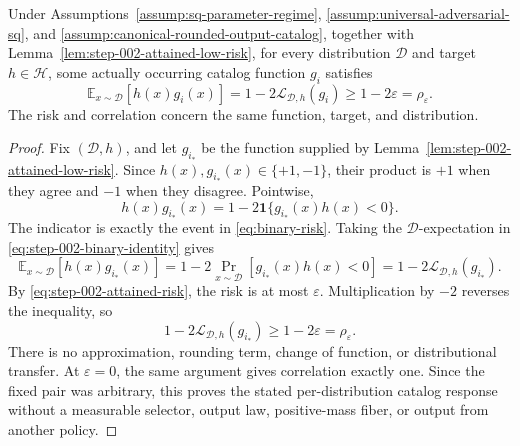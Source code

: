 \begin{proposition}
\label{prop:step-002-exact-correlation}
Under Assumptions~\ref{assump:sq-parameter-regime},
\ref{assump:universal-adversarial-sq}, and
\ref{assump:canonical-rounded-output-catalog}, together with
Lemma~\ref{lem:step-002-attained-low-risk}, for every distribution
\(\mathcal D\) and target \(h\in\mathcal H\), some actually occurring
catalog function \(g_i\) satisfies
\begin{equation}
\mathbb E_{x\sim\mathcal D}[h(x)g_i(x)]
=1-2\mathcal L_{\mathcal D,h}(g_i)
\ge1-2\varepsilon
=\rho_{\varepsilon}.
\label{eq:step-002-correlation}
\end{equation}
The risk and correlation concern the same function, target, and distribution.
\end{proposition}

\begin{proof}
Fix \((\mathcal D,h)\), and let \(g_{i_*}\) be the function supplied by
Lemma~\ref{lem:step-002-attained-low-risk}.  Since
\(h(x),g_{i_*}(x)\in\{+1,-1\}\), their product is \(+1\) when they agree and
\(-1\) when they disagree.  Pointwise,
\begin{equation}
h(x)g_{i_*}(x)
=1-2\mathbf 1\{g_{i_*}(x)h(x)<0\}.
\label{eq:step-002-binary-identity}
\end{equation}
The indicator is exactly the event in \eqref{eq:binary-risk}.  Taking the
\(\mathcal D\)-expectation in \eqref{eq:step-002-binary-identity} gives
\begin{equation}
\mathbb E_{x\sim\mathcal D}[h(x)g_{i_*}(x)]
=1-2\Pr_{x\sim\mathcal D}[g_{i_*}(x)h(x)<0]
=1-2\mathcal L_{\mathcal D,h}(g_{i_*}).
\label{eq:step-002-risk-correlation-identity}
\end{equation}
By \eqref{eq:step-002-attained-risk}, the risk is at most \(\varepsilon\).
Multiplication by \(-2\) reverses the inequality, so
\[
1-2\mathcal L_{\mathcal D,h}(g_{i_*})
\ge1-2\varepsilon=\rho_{\varepsilon}.
\]
There is no approximation, rounding term, change of function, or
distributional transfer.  At \(\varepsilon=0\), the same argument gives
correlation exactly one.  Since the fixed pair was arbitrary, this proves the
stated per-distribution catalog response without a measurable selector,
output law, positive-mass fiber, or output from another policy.
\end{proof}

